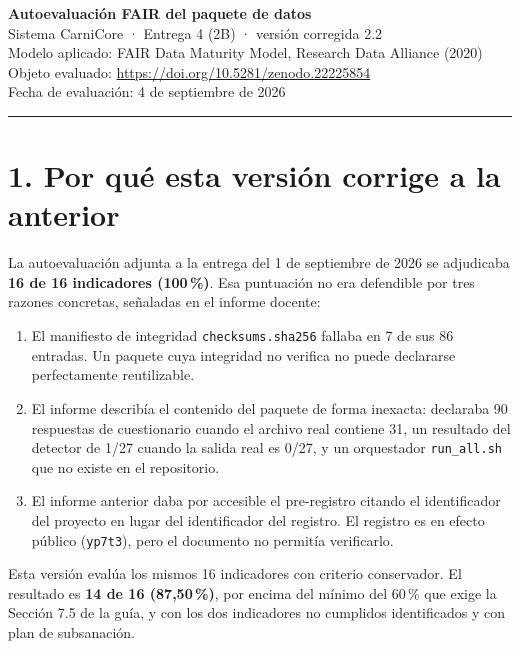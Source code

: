 \documentclass[11pt,a4paper]{article}
\begin{document}
\begin{center}
{\Large\bfseries\color{uteqverde} Autoevaluación FAIR del paquete de datos}\\[4pt]
{\large Sistema CarniCore · Entrega 4 (2B) · versión corregida 2.2}\\[8pt]
{\small Modelo aplicado: FAIR Data Maturity Model, Research Data Alliance (2020)}\\
{\small Objeto evaluado: \url{https://doi.org/10.5281/zenodo.22225854}}\\
{\small Fecha de evaluación: 4 de septiembre de 2026}
\end{center}

\vspace{4pt}
\hrule
\vspace{10pt}

\section*{1. Por qué esta versión corrige a la anterior}

La autoevaluación adjunta a la entrega del 1 de septiembre de 2026 se adjudicaba
\textbf{16 de 16 indicadores (100\,\%)}. Esa puntuación no era defendible por
tres razones concretas, señaladas en el informe docente:

\begin{enumerate}
\item El manifiesto de integridad \texttt{checksums.sha256} fallaba en 7 de sus
      86 entradas. Un paquete cuya integridad no verifica no puede declararse
      perfectamente reutilizable.
\item El informe describía el contenido del paquete de forma inexacta: declaraba
      90 respuestas de cuestionario cuando el archivo real contiene 31, un
      resultado del detector de 1/27 cuando la salida real es 0/27, y un
      orquestador \texttt{run\_all.sh} que no existe en el repositorio.
\item El informe anterior daba por accesible el pre-registro citando el
      identificador del proyecto en lugar del identificador del registro. El
      registro es en efecto público (\texttt{yp7t3}), pero el documento no
      permitía verificarlo.
\end{enumerate}

Esta versión evalúa los mismos 16 indicadores con criterio conservador. El
resultado es \textbf{14 de 16 (87,50\,\%)}, por encima del mínimo del 60\,\% que
exige la Sección 7.5 de la guía, y con los dos indicadores no cumplidos
identificados y con plan de subsanación.
\end{document}
